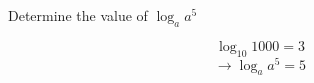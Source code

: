 \question Determine the value of $\log_{a}{a^{5}}$
\begin{solution}
	\[
		\log_{10}{1000} = 3
	\]
	\[
		\rightarrow
		\log_{a}{a^{5}} = 5
	\]
\end{solution}

